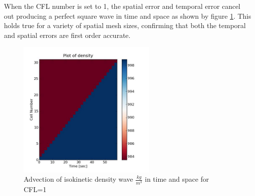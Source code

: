     When the CFL number is set to 1, the spatial error and temporal error
    cancel out producing a perfect square wave in time and space as shown by
    figure \ref{fig:density_2D}. This holds true for a variety of spatial
    mesh sizes, confirming that both the temporal and spatial errors are first
    order accurate. 
    
    \begin{figure}[!h]
    	\centering
    	\includegraphics[width=0.60\textwidth]{images/Isokinetic_Advection/density_2D}
    	\caption{Advection of isokinetic density wave $\frac{kg}{m^{3}}$ in time
    	and space for CFL=1}
    	\label{fig:density_2D}
    \end{figure}








